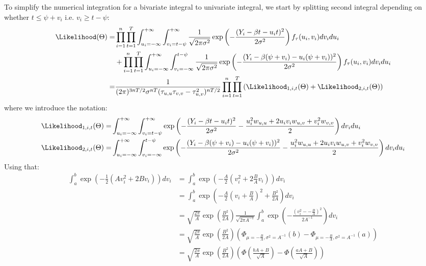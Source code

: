 \documentclass[12pt]{article}
\begin{document}
To simplify the numerical integration for a bivariate integral to
univariate integral, we start by splitting second integral depending
on whether \(t \leq \psi + v_i\) i.e. \(v_i \geq t - \psi\):
\begin{align*}
\Likelihood(\Theta) =& \prod_{i=1}^n \prod_{t=1}^T \int_{u_i=-\infty}^{+\infty}\int_{v_i=t-\psi}^{+\infty} \frac{1}{\sqrt{2\pi\sigma^2}}\exp\left(-\frac{(Y_i - \beta t - u_i t)^2}{2\sigma^2}\right)f_{\tau}(u_i,v_i) dv_i du_i \\
                   & + \prod_{i=1}^n \prod_{t=1}^T \int_{u_i=-\infty}^{+\infty}\int_{v_i=-\infty}^{t-\psi} \frac{1}{\sqrt{2\pi\sigma^2}}\exp\left(-\frac{(Y_i - \beta (\psi + v_i) - u_i (\psi + v_i))^2}{2\sigma^2}\right)f_{\tau}(u_i,v_i) dv_i du_i \\
                   =& \frac{1}{(2\pi)^{3nT/2}\sigma^{nT}(\tau_{u,u}\tau_{v,v}-\tau^2_{u,v})^{nT/2}} \prod_{i=1}^n \prod_{t=1}^T \left(\Likelihood_{1,i,t}(\Theta) + \Likelihood_{2,i,t}(\Theta) \right)
\end{align*}
where we introduce the notation:
\begin{align*}
\Likelihood_{1,i,t}(\Theta) =& \int_{u_i=-\infty}^{+\infty}\int_{v_i=t-\psi}^{+\infty} \exp\left(-\frac{(Y_i - \beta t - u_i t)^2}{2\sigma^2} - \frac{u_i^2 w_{u,u}+2u_i v_i w_{u,v}+v_i^2 w_{v,v}}{2}\right) dv_i du_i \\
\Likelihood_{2,i,t}(\Theta) =& \int_{u_i=-\infty}^{+\infty}\int_{v_i=-\infty}^{t-\psi} \exp\left(-\frac{(Y_i - \beta (\psi + v_i) - u_i (\psi + v_i))^2}{2\sigma^2} - \frac{u_i^2 w_{u,u}+2u_i v_i w_{u,v}+v_i^2 w_{v,v}}{2}\right) dv_i du_i
\end{align*}
Using that:
\begin{align*}
\int_{a}^{b} \exp\left( - \frac{1}{2}(A v_i^2 + 2 B v_i) \right) dv_i 
&= \int_{a}^{b} \exp\left( - \frac{A}{2}(v_i^2 + 2 \frac{B}{A} v_i) \right) dv_i  \\
&= \int_{a}^{b} \exp\left( - \frac{A}{2}(v_i + \frac{B}{A})^2 + \frac{B^2}{2 A} \right) dv_i  \\ 
&= \sqrt{\frac{2 \pi}{A}}\exp\left(\frac{B^2}{2 A}\right)\frac{1}{\sqrt{2 \pi A^{-1}}} \int_{a}^{b} \exp\left( - \frac{(v^2_i- -\frac{B}{A})^2}{2A^{-1}} \right) dv_i \\
&= \sqrt{\frac{2 \pi}{A}}\exp\left(\frac{B^2}{2 A}\right) \left(\Phi_{\mu=-\frac{B}{A},\sigma^2=A^{-1}}(b) - \Phi_{\mu=-\frac{B}{A},\sigma^2=A^{-1}}(a) \right) \\
&= \sqrt{\frac{2 \pi}{A}}\exp\left(\frac{B^2}{2 A}\right) \left(\Phi\left(\frac{bA+B}{\sqrt{A}}\right) - \Phi\left(\frac{aA+B}{\sqrt{A}}\right) \right)
\end{align*}
\end{document}
